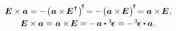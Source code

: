 \nopagebreak\vspace{-0.25em}\begin{equation}\begin{array}{c}
\UnitDyad \times \bm{a}
= - \hspace{.25ex} \bigl( \hspace{.1ex} \bm{a} \times \hspace{-0.25ex} \UnitDyad^{\hspace{.1ex}\T} \hspace{.1ex} \bigr)^{\hspace{-0.3ex}\T} \hspace{-0.4ex}
= - \hspace{.25ex} \bigl( \bm{a} \times \hspace{-0.25ex} \UnitDyad \hspace{.15ex} \bigr)^{\hspace{-0.25ex}\T} \hspace{-0.4ex}
= \bm{a} \times \hspace{-0.25ex} \UnitDyad
\hspace{.15ex} ,
\\[.25em]
%
\UnitDyad \times \bm{a} = \hspace{.1ex} \bm{a} \times \hspace{-0.25ex} \UnitDyad
= - \hspace{.25ex} \bm{a} \dotp \permutationsparitytensor
= - \hspace{.2ex} \permutationsparitytensor \dotp \bm{a}
\hspace{.2ex} .
\end{array}\end{equation}

